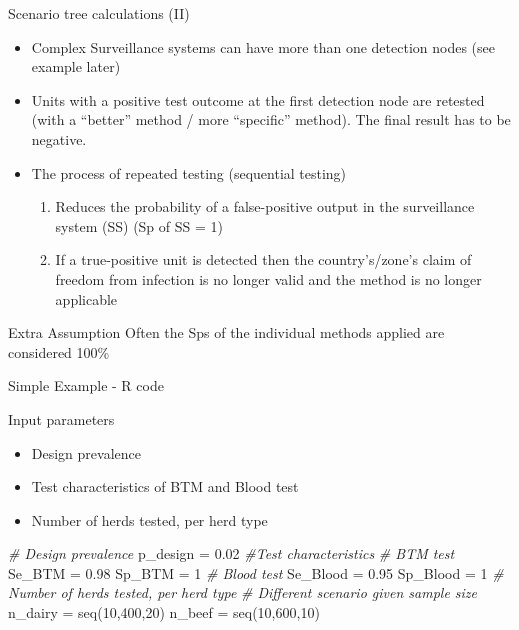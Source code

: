 \documentclass[
  ignorenonframetext,
]{beamer}
\newenvironment{Shaded}{\begin{snugshade}}{\end{snugshade}}
\newcommand{\CommentTok}[1]{\textcolor[rgb]{0.56,0.35,0.01}{\textit{#1}}}
\newcommand{\DecValTok}[1]{\textcolor[rgb]{0.00,0.00,0.81}{#1}}
\newcommand{\FloatTok}[1]{\textcolor[rgb]{0.00,0.00,0.81}{#1}}
\newcommand{\FunctionTok}[1]{\textcolor[rgb]{0.00,0.00,0.00}{#1}}
\newcommand{\NormalTok}[1]{#1}
\newcommand{\OtherTok}[1]{\textcolor[rgb]{0.56,0.35,0.01}{#1}}
\providecommand{\tightlist}{%
  \setlength{\itemsep}{0pt}\setlength{\parskip}{0pt}}
\begin{document}
\begin{frame}{Scenario tree calculations (II)}
\protect\hypertarget{scenario-tree-calculations-ii}{}
\begin{itemize}
\item
  Complex Surveillance systems can have more than one detection nodes
  (see example later)
\item
  Units with a positive test outcome at the first detection node are
  retested (with a ``better'' method / more ``specific'' method). The
  final result has to be negative.
\item
  The process of repeated testing (sequential testing)

  \begin{enumerate}
  \item Reduces the probability of a false-positive output in the surveillance system (SS) (Sp of SS = 1)
  \item If a true-positive unit is detected then the country's/zone's claim of freedom from infection is no longer valid and the method is no longer applicable
  \end{enumerate}
\end{itemize}

\begin{block}{Extra Assumption}
\protect\hypertarget{extra-assumption}{}
Often the Sps of the individual methods applied are considered 100\%
\end{block}
\end{frame}

\begin{frame}[fragile]{Simple Example - R code}
\protect\hypertarget{simple-example---r-code}{}
\begin{block}{Input parameters}
\protect\hypertarget{input-parameters}{}
\begin{itemize}
\tightlist
\item
  Design prevalence
\item
  Test characteristics of BTM and Blood test
\item
  Number of herds tested, per herd type
\end{itemize}

\begin{Shaded}
\begin{Highlighting}[]
\CommentTok{\# Design prevalence}
\NormalTok{p\_design }\OtherTok{=} \FloatTok{0.02}
\CommentTok{\#Test characteristics}
\CommentTok{\# BTM test}
\NormalTok{Se\_BTM }\OtherTok{=} \FloatTok{0.98}
\NormalTok{Sp\_BTM }\OtherTok{=} \DecValTok{1}
\CommentTok{\# Blood test}
\NormalTok{Se\_Blood }\OtherTok{=} \FloatTok{0.95}
\NormalTok{Sp\_Blood }\OtherTok{=} \DecValTok{1}
\CommentTok{\# Number of herds tested, per herd type}
\CommentTok{\# Different scenario given sample size}
\NormalTok{n\_dairy }\OtherTok{=} \FunctionTok{seq}\NormalTok{(}\DecValTok{10}\NormalTok{,}\DecValTok{400}\NormalTok{,}\DecValTok{20}\NormalTok{)}
\NormalTok{n\_beef }\OtherTok{=} \FunctionTok{seq}\NormalTok{(}\DecValTok{10}\NormalTok{,}\DecValTok{600}\NormalTok{,}\DecValTok{10}\NormalTok{)}
\end{Highlighting}
\end{Shaded}
\end{block}
\end{frame}
\end{document}
